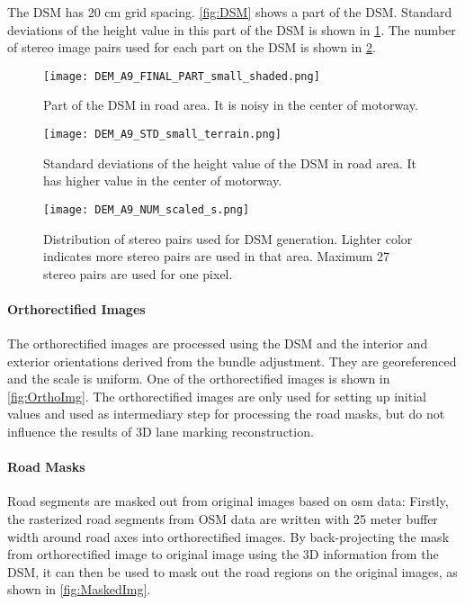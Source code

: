 The DSM has 20 cm grid spacing. \cref{fig:DSM} shows a part of the DSM. Standard deviations of the height value in this part of the DSM is shown in \cref{fig:DSMstd}. The number of stereo image pairs used for each part on the DSM is shown in \cref{fig:DSMnumber}.
\begin{figure}%
  \centering
  \texttt{[image: DEM\_A9\_FINAL\_PART\_small\_shaded.png]}
  \caption{\small Part of the DSM in road area. It is noisy in the center of motorway.}
  \label{fig:DSM}
  \vspace{1cm}
  \centering
  \texttt{[image: DEM\_A9\_STD\_small\_terrain.png]}
  \caption{\small Standard deviations of the height value of the DSM in road area. It has higher value in the center of motorway.}
  \label{fig:DSMstd}

\end{figure}

\begin{figure}%
  \centering
  \texttt{[image: DEM\_A9\_NUM\_scaled\_s.png]}
  \caption{\small Distribution of stereo pairs used for DSM generation. Lighter color indicates more stereo pairs are used in that area. Maximum 27 stereo pairs are used for one pixel.}%
  \label{fig:DSMnumber}
\end{figure}


\paragraph{Orthorectified Images}
The orthorectified images are processed using the DSM and the interior and exterior orientations derived from the bundle adjustment. They are georeferenced and the scale is uniform. One of the orthorectified images is shown in \cref{fig:OrthoImg}. The orthorectified images are only used for setting up initial values and used as intermediary step for processing the road masks, but do not influence the results of 3D lane marking reconstruction.

\paragraph{Road Masks}
Road segments are masked out from original images based on \gls{osm} data: Firstly, the rasterized road segments from OSM data are written with 25 meter buffer width around road axes into orthorectified images. By back-projecting the mask from orthorectified image to original image using the 3D information from the DSM, it can then be used to mask out the road regions on the original images, as shown in \cref{fig:MaskedImg}.

